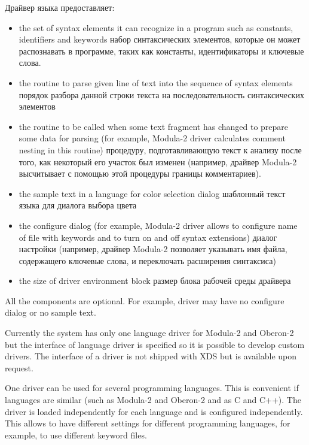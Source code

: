 Драйвер языка предоставляет: 
\fi
\begin{itemize}
\item \ifenglish
      the set of syntax elements it can recognize in a program such as constants,
      identifiers and keywords
      \else
      набор синтаксических элементов, которые он может распознавать в программе, 
      таких как константы, идентификаторы и ключевые слова.
      \fi
\item \ifenglish
      the routine to parse given line of text into the sequence of syntax elements
      \else
      порядок разбора данной строки текста на последовательность синтаксических 
      элементов
      \fi
\item \ifenglish
      the routine to be called when some text fragment has changed to prepare
      some data for parsing (for example, Modula-2 driver calculates comment nesting
      in this routine)
      \else
      процедуру, подготавливающую текст к анализу после того, как некоторый его
      участок был изменен (например, драйвер Modula-2 высчитывает с помощью этой
      процедуры границы комментариев).  
      \fi
\item \ifenglish
      the sample text in a language for color selection dialog
      \else
      шаблонный текст языка для диалога выбора цвета
      \fi
\item \ifenglish
      the configure dialog (for example, Modula-2 driver allows to configure
      name of file with keywords and to turn on and off syntax extensions)
      \else
      диалог настройки (например, драйвер Modula-2 позволяет указывать имя 
      файла, содержащего ключевые слова, и переключать расширения синтаксиса)
      \fi
\item \ifenglish
      the size of driver environment block
      \else
      размер блока рабочей среды драйвера
      \fi
\end{itemize}

\ifenglish
All the components are optional. For example, driver may have no configure
dialog or no sample text.

Currently the system has only one language driver for Modula-2 and Oberon-2 but
the interface of language driver is specified so it is possible to develop
custom drivers. The interface of a driver is not shipped with XDS but is available upon request.

One driver can be used for several programming languages. This is convenient if
languages are similar (such as Modula-2 and Oberon-2 and as C and C++).
The driver is loaded independently for each language and is configured independently.
This allows to have different settings for different programming languages, for
example, to use different keyword files.

